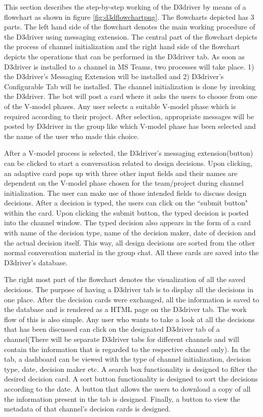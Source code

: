 This section describes the step-by-step working of the D3driver by means of a flowchart as shown in figure \ref{fig:d3dflowchartpng}. The flowcharts depicted has 3 parts. The left hand side of the flowchart denotes the main working procedure of the D3driver using messaging extension. The central part of the flowchart depicts the process of channel initialization and the right hand side of the flowchart depicts the operations that can be performed in the D3driver tab. As soon as D3driver is installed to a channel in MS Teams, two processes will take place. 1) the D3driver's Messaging Extension will be installed and 2) D3driver's Configurable Tab will be installed. The channel initialization is done by invoking the D3driver. The bot will post a card where it asks the users to choose from one of the V-model phases. Any user selects a suitable V-model phase which is required according to their project. After selection, appropriate messages will be posted by D3driver in the group like which V-model phase has been selected and the name of the user who made this choice. 

After a V-model process is selected, the D3driver’s messaging extension(button) can be clicked to start a conversation related to design decisions. Upon clicking, an adaptive card pops up with three other input fields and their names are dependent on the V-model phase chosen for the team/project during channel initialization. The user can make use of those intended fields to discuss design decisions. After a decision is typed, the users can click on the ``submit button" within the card. Upon clicking the submit button, the typed decision is posted into the channel window. The typed decision also appears in the form of a card with name of the decision type, name of the decision maker, date of decision and the actual decision itself. This way, all design decisions are sorted from the other normal conversation material in the group chat. All these cards are saved into the D3driver's database.

The right most part of the flowchart denotes the visualization of all the saved decisions. The purpose of having a D3driver tab is to display all the decisions in one place. After the decision cards were exchanged, all the information is saved to the database and is rendered as a HTML page on the D3driver tab. The work flow of this is also simple. Any user who wants to take a look at all the decisions that has been discussed can click on the designated D3driver tab of a channel(There will be separate D3driver tabs for different channels and will contain the information that is regarded to the respective channel only). In the tab, a dashboard can be viewed with the type of channel initialization, decision type, date, decision maker etc. A search box functionality is designed to filter the desired decision card. A sort button functionality is designed to sort the decisions according to the date. A button that allows the users to download a copy of all the information present in the tab is designed. Finally, a button to view the metadata of that channel's decision cards is designed.

